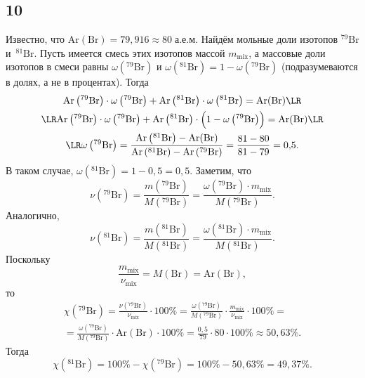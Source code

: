 \subsection{10}

Известно, что $\mathrm{Ar}(\mathrm{Br})=79{,}916\approx80\;\text{а.е.м.}$ Найдём мольные доли изотопов $^{79}\mathrm{Br}$ и~$^{81}\mathrm{Br}$. Пусть имеется смесь этих изотопов массой $m_\text{mix}$, а массовые доли изотопов в смеси равны $\omega\left(^{79}\mathrm{Br}\right)$ и $\omega\left(^{81}\mathrm{Br}\right)=1-\omega\left(^{79}\mathrm{Br}\right)$ (подразумеваются в долях, а не в процентах). Тогда
\begin{multline*}
\mathrm{Ar}\left(^{79}\mathrm{Br}\right)\cdot\omega\left(^{79}\mathrm{Br}\right)+\mathrm{Ar}\left(^{81}\mathrm{Br}\right)\cdot\omega\left(^{81}\mathrm{Br}\right)=\mathrm{Ar}(\mathrm{Br})\LR \\
\LR  \mathrm{Ar}\left(^{79}\mathrm{Br}\right)\cdot\omega\left(^{79}\mathrm{Br}\right)+\mathrm{Ar}\left(^{81}\mathrm{Br}\right)\cdot\Bigl(1-\omega\left(^{79}\mathrm{Br}\right)\Bigr)=\mathrm{Ar}(\mathrm{Br})\LR \\
\LR\omega\left(^{79}\mathrm{Br}\right)=\frac{\mathrm{Ar}\left(^{81}\mathrm{Br}\right)-\mathrm{Ar}(\mathrm{Br})}{\mathrm{Ar}\left(^{81}\mathrm{Br}\right)-\mathrm{Ar}\left(^{79}\mathrm{Br}\right)}=\frac{81-80}{81-79}=0{,}5.
\end{multline*}
В таком случае, $\omega\left(^{81}\mathrm{Br}\right)=1-0{,}5=0{,}5$. Заметим, что
\[
\nu\left(^{79}\mathrm{Br}\right)=\frac{m\left(^{79}\mathrm{Br}\right)}{M\left(^{79}\mathrm{Br}\right)}=\frac{\omega\left(^{79}\mathrm{Br}\right)\cdot m_\text{mix}}{M\left(^{79}\mathrm{Br}\right)}.
\]
Аналогично,
\[
\nu\left(^{81}\mathrm{Br}\right)=\frac{m\left(^{81}\mathrm{Br}\right)}{M\left(^{81}\mathrm{Br}\right)}=\frac{\omega\left(^{81}\mathrm{Br}\right)\cdot m_\text{mix}}{M\left(^{81}\mathrm{Br}\right)}.
\]
Поскольку
\[
\frac{m_\text{mix}}{\nu_\text{mix}}=M(\mathrm{Br})=\mathrm{Ar}(\mathrm{Br}),
\]
то
\begin{multline*}
\chi\left(^{79}\mathrm{Br}\right)=\frac{\nu\left(^{79}\mathrm{Br}\right)}{\nu_\text{mix}}\cdot100\%=\frac{\omega\left(^{79}\mathrm{Br}\right)}{M\left(^{79}\mathrm{Br}\right)}\cdot\frac{m_\text{mix}}{\nu_\text{mix}}\cdot100\%= \\
=\frac{\omega\left(^{79}\mathrm{Br}\right)}{M\left(^{79}\mathrm{Br}\right)}\cdot\mathrm{Ar}(\mathrm{Br})\cdot100\%=\frac{0{,}5}{79}\cdot80\cdot100\%\approx50{,}63\%.
\end{multline*}
Тогда
\[
\chi\left(^{81}\mathrm{Br}\right)=100\%-\chi\left(^{79}\mathrm{Br}\right)=100\%-50{,}63\%=49{,}37\%.
\]